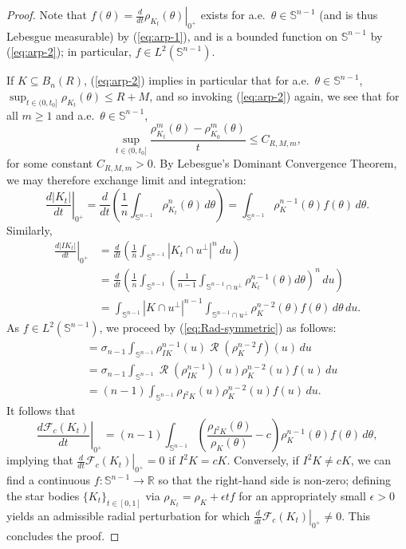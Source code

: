 \documentclass[11pt]{article}
\theoremstyle{definition}
\theoremstyle{proof}
\newcommand{\dt}[1]{\left . \frac{d}{dt} #1 \right |_{0^+}}
\newcommand{\dht}[1]{\left . \frac{d#1}{dt}\right |_{0^+}}
\DeclareMathOperator{\+}{\mathop{\tilde{+}}}
\DeclareMathOperator{\Rad}{\mathcal{R}}
\newcommand{\brac}[1]{\left(#1\right)}
\newcommand{\R}{\mathbb{R}}
\renewcommand{\S}{\mathbb{S}}
\newcommand{\F}{\mathcal{F}}
\newcommand{\eps}{\epsilon}
\numberwithin{equation}{section}
\numberwithin{equation}{section}
\begin{document}
\begin{proof}
Note that $f(\theta) = \dt{\rho_{K_t}(\theta)}$ exists  for a.e.~$\theta \in \S^{n-1}$ (and is thus Lebesgue measurable) by (\ref{eq:arp-1}), and is a bounded function on $\S^{n-1}$ by (\ref{eq:arp-2}); in particular, $f \in L^2(\S^{n-1})$.

If $K \subseteq B_n(R)$, (\ref{eq:arp-2}) implies in particular that for a.e.~$\theta \in \S^{n-1}$, $\sup_{t \in (0,t_0]} \rho_{K_t}(\theta) \leq R + M$, and so invoking (\ref{eq:arp-2}) again, we see that for all $m \geq 1$ and a.e.~$\theta \in \S^{n-1}$,
\[
\sup_{t \in (0,t_0]} \frac{\rho_{K_t}^m(\theta) - \rho_{K_0}^m(\theta)}{t} \leq C_{R,M,m} ,
\]
for some constant $C_{R,M,m} > 0$. By Lebesgue's Dominant Convergence Theorem, we may therefore exchange limit and integration:
\[
\dht{|K_t|} = \frac{d}{dt} \brac{\frac{1}{n} \int_{\S^{n-1}} \rho_{K_t}^n(\theta) \, d\theta }=  \int_{\S^{n-1}} \rho_{K}^{n-1}(\theta) f(\theta) \, d\theta .
\]
Similarly,
\begin{align*}
\dht{|IK_t|} & = \frac{d}{dt} \brac{\frac{1}{n} \int_{\S^{n-1}} |K_t \cap u^{\perp}|^n \, du} \\
& = \frac{d}{dt} \brac{\frac{1}{n} \int_{\S^{n-1}} \brac{ \frac{1}{n-1} \int_{\S^{n-1} \cap u^{\perp}} \rho^{n-1}_{K_t}(\theta) d\theta}^n \, du} \\
& = \int_{\S^{n-1}} |K \cap u^{\perp}|^{n-1} \int_{\S^{n-1} \cap u^{\perp}} \rho_K^{n-2}(\theta) f(\theta) \, d\theta \, du . 
\end{align*}
As $f  \in L^2(\S^{n-1})$, we proceed by (\ref{eq:Rad-symmetric}) as follows:
\begin{align*}
 & = \sigma_{n-1} \int_{\S^{n-1}} \rho^{n-1}_{IK}(u) \Rad(\rho_K^{n-2} f)(u) \, du \\
 & = \sigma_{n-1}  \int_{\S^{n-1}} \Rad(\rho^{n-1}_{IK})(u)  \rho_K^{n-2}(u) f(u) \, du \\
 & = (n-1) \int_{\S^{n-1}} \rho_{I^2 K}(u) \rho_K^{n-2}(u) f(u) \, du . 
\end{align*}
It follows that
\[
\dht{\F_c(K_t)} = (n-1) \int_{\S^{n-1}} \brac{\frac{\rho_{I^2 K}(\theta)}{\rho_K(\theta)} - c} \rho_{K}^{n-1}(\theta) f(\theta)  \, d\theta ,
\]
implying that $\dt{\F_c(K_t)} = 0$ if $I^2 K = c K$. Conversely, if $I^2 K \neq c K$, we can find a continuous $f : \S^{n-1} \rightarrow \R$ so that the right-hand side is non-zero; defining the star bodies $\{K_t\}_{t \in [0,1]}$ via $\rho_{K_t} = \rho_K + \eps t f$ for an appropriately small $\eps > 0$ yields an admissible radial perturbation for which $\dt{\F_c(K_t)} \neq 0$. This concludes the proof. 
\end{proof}
\end{document}
